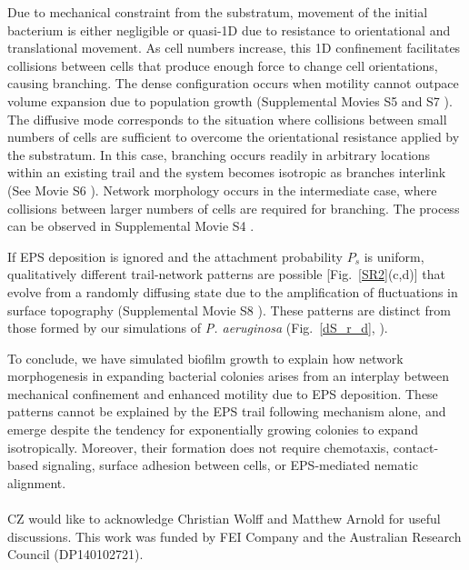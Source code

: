 \documentclass[aps,prl,numerical,reprint,superscriptaddress,showpacs]{revtex4-1}
\begin{document}
Due to mechanical constraint from the substratum, movement of the initial bacterium is either negligible or quasi-1D due to resistance to orientational and translational movement. As cell numbers increase, this 1D confinement facilitates collisions between cells that produce enough force to change cell orientations, causing branching. The dense configuration occurs when motility cannot outpace volume expansion due to population growth (Supplemental Movies S5 and S7 \cite{Supp}). The diffusive mode corresponds to the situation where collisions between small numbers of cells are sufficient to overcome the orientational resistance applied by the substratum. In this case, branching occurs readily in arbitrary locations within an existing trail and the system becomes isotropic as branches interlink (See Movie S6 \cite{Supp}). Network morphology occurs in the intermediate case, where collisions between larger numbers of cells are required for branching. The process can be observed in Supplemental Movie S4 \cite{Supp}. 

If EPS deposition is ignored and the attachment probability $P_s$ is uniform, qualitatively different trail-network patterns are possible [Fig.~\ref{SR2}(c,d)] that evolve from a randomly diffusing state due to the amplification of fluctuations in surface topography (Supplemental Movie S8 \cite{Supp}). These patterns are distinct from those formed by our simulations of {\it {P. aeruginosa}} (Fig.~\ref{dS_r_d}, \cite{Supp}). 

To conclude, we have simulated biofilm growth to explain how network morphogenesis in expanding bacterial colonies arises from an interplay between mechanical confinement and enhanced motility due to EPS deposition. These patterns cannot be explained by the EPS trail following mechanism alone, and emerge despite the tendency for exponentially growing colonies to expand isotropically. Moreover, their formation does not require chemotaxis, contact-based signaling, surface adhesion between cells, or EPS-mediated nematic alignment. 
\\\\
CZ would like to acknowledge Christian Wolff and Matthew Arnold for useful discussions. This work was funded by FEI Company and the Australian Research Council (DP140102721).

\end{document}
